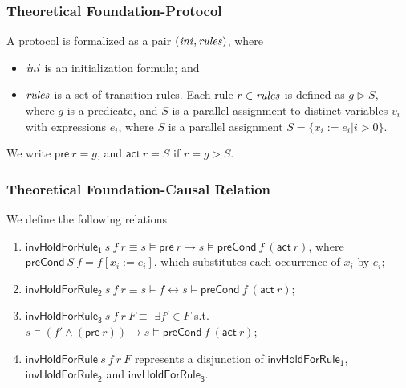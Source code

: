 \documentclass{beamer}
\begin{document}
\begin{frame}\frametitle{Theoretical Foundation-Protocol}
\noindent
A  protocol is formalized as a pair $({\it ini}, {\it rules})$, where
\begin{itemize}
\item ${\it ini}$ is an initialization formula; and
\item  ${\it rules}$ is a set of transition rules. Each rule $r\in {\it rules}$ is defined as
  $g \vartriangleright  S$, where $g$ is a predicate, and $S$ is a
  parallel assignment to distinct  variables $v_i$ with expressions
  $e_i$, where $S$ is  a parallel assignment $S=\{x_i:=e_i | i>0\}$.
\end{itemize}
We write $\mathsf{pre}~r=g$, and $\mathsf{act}~r=S$
  if $r=g \vartriangleright S$.
\end{frame}

\begin{frame}\frametitle{Theoretical Foundation-Causal Relation}



\begin{definition}
We define the following relations
\begin{enumerate}
\item $\mathsf{invHoldForRule_1}~s ~f ~r \equiv  s \models \mathsf{pre}~ r \longrightarrow s \models \mathsf{preCond}~ f ~(\mathsf{act}~ r)$, where $\mathsf{preCond}~S~f=f[x_i:=e_i]$, which substitutes each
occurrence of $x_i$ by $e_i$;
\item $\mathsf{invHoldForRule_2}~s~ f~ r \equiv  s \models f \longleftrightarrow  s \models\mathsf{preCond}~ f~(\mathsf{act}~ r)$;
\item $\mathsf{invHoldForRule_3}~s~ f~ r ~F \equiv$  $\exists f' \in F$ s.t.
$s \models (f' \wedge (\mathsf{pre}~ r)) \longrightarrow s \models \mathsf{preCond} ~f ~(\mathsf{act}   ~r)$;
\item $\mathsf{invHoldForRule}~s~ f~ r ~F$ represents a disjunction of $\mathsf{invHoldForRule_1}$, $\mathsf{invHoldForRule_2}$
and $\mathsf{invHoldForRule_3}$.
\end{enumerate}
\end{definition}
\end{frame}
\end{document}
